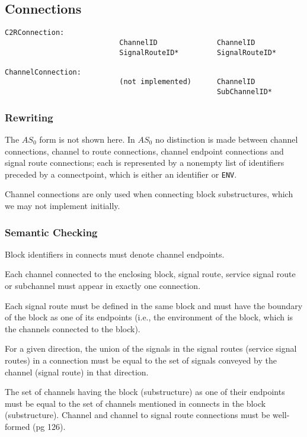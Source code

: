 \subsection{Connections}

\begin{verbatim}
C2RConnection:
                           ChannelID              ChannelID
                           SignalRouteID*         SignalRouteID*

ChannelConnection:
                           (not implemented)      ChannelID
                                                  SubChannelID*
\end{verbatim}

\subsubsection{Rewriting}

The $AS_0$ form is not shown here. In $AS_0$ no distinction is made
between channel connections, channel to route connections, channel
endpoint connections and signal route connections; each is
represented by a nonempty list of identifiers preceded by a
connectpoint, which is either an identifier or {\tt ENV}.

Channel connections are only used when connecting block
substructures, which we may not implement initially.

\subsubsection{Semantic Checking}

Block identifiers in connects must denote channel endpoints.

Each channel connected to the enclosing block, signal route,
service signal route or subchannel must appear in exactly one connection.

Each signal route must be defined in the same block and must have the
boundary of the block as one of its endpoints (i.e., the environment
of the block, which is the channels connected to the block).

For a given direction, the union of the signals in the signal routes
(service signal routes) in a connection must be equal to the set 
of signals conveyed by the channel (signal route) in that direction.

The set of channels having the block (substructure) as one of 
their endpoints must be equal to the set of channels mentioned in 
connects in the block (substructure).
Channel and channel to signal route connections must be well-formed (pg
126).

